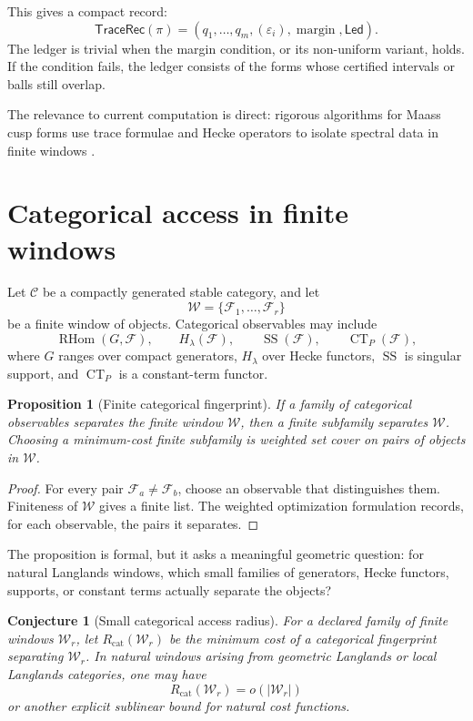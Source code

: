 \documentclass[11pt]{article}
\newtheorem{proposition}[theorem]{Proposition}
\newtheorem{conjecture}[theorem]{Conjecture}
\DeclareMathOperator{\RHom}{RHom}
\DeclareMathOperator{\SSupp}{SS}
\DeclareMathOperator{\CT}{CT}
\begin{document}
This gives a compact record:
\[
\mathsf{TraceRec}(\pi)=
(q_1,\ldots,q_m,(\varepsilon_i),\operatorname{margin},\mathsf{Led}).
\]
The ledger is trivial when the margin condition, or its non-uniform variant, holds.  If the condition fails, the ledger consists of the forms whose certified intervals or balls still overlap.

The relevance to current computation is direct: rigorous algorithms for Maass cusp forms use trace formulae and Hecke operators to isolate spectral data in finite windows \cite{seymourhowell}.

\section{Categorical access in finite windows}

Let \(\mathcal C\) be a compactly generated stable category, and let
\[
\mathcal W=\{\mathcal F_1,\ldots,\mathcal F_r\}
\]
be a finite window of objects.  Categorical observables may include
\[
\RHom(G,\mathcal F),
\qquad
H_\lambda(\mathcal F),
\qquad
\SSupp(\mathcal F),
\qquad
\CT_P(\mathcal F),
\]
where \(G\) ranges over compact generators, \(H_\lambda\) over Hecke functors, \(\SSupp\) is singular support, and \(\CT_P\) is a constant-term functor.

\begin{proposition}[Finite categorical fingerprint]
If a family of categorical observables separates the finite window \(\mathcal W\), then a finite subfamily separates \(\mathcal W\).  Choosing a minimum-cost finite subfamily is weighted set cover on pairs of objects in \(\mathcal W\).
\end{proposition}

\begin{proof}
For every pair \(\mathcal F_a\neq\mathcal F_b\), choose an observable that distinguishes them.  Finiteness of \(\mathcal W\) gives a finite list.  The weighted optimization formulation records, for each observable, the pairs it separates.
\end{proof}

The proposition is formal, but it asks a meaningful geometric question: for natural Langlands windows, which small families of generators, Hecke functors, supports, or constant terms actually separate the objects?

\begin{conjecture}[Small categorical access radius]
For a declared family of finite windows \(\mathcal W_r\), let \(R_{\mathrm{cat}}(\mathcal W_r)\) be the minimum cost of a categorical fingerprint separating \(\mathcal W_r\).  In natural windows arising from geometric Langlands or local Langlands categories, one may have
\[
R_{\mathrm{cat}}(\mathcal W_r)=o(|\mathcal W_r|)
\]
or another explicit sublinear bound for natural cost functions.
\end{conjecture}
\end{document}
